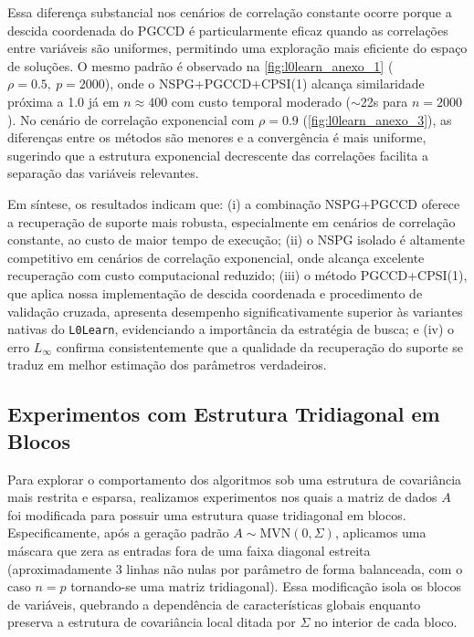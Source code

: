 Essa diferença substancial nos cenários de correlação constante ocorre porque a descida coordenada do PGCCD é particularmente eficaz quando as correlações entre variáveis são uniformes, permitindo uma exploração mais eficiente do espaço de soluções. O mesmo padrão é observado na \autoref{fig:l0learn_anexo_1} ($\rho=0.5,\ p=2000$), onde o NSPG+PGCCD+CPSI(1) alcança similaridade próxima a 1.0 já em $n \approx 400$ com custo temporal moderado ($\sim$22s para $n=2000$). No cenário de correlação exponencial com $\rho=0.9$ (\autoref{fig:l0learn_anexo_3}), as diferenças entre os métodos são menores e a convergência é mais uniforme, sugerindo que a estrutura exponencial decrescente das correlações facilita a separação das variáveis relevantes.

Em síntese, os resultados indicam que: (i) a combinação NSPG+PGCCD oferece a recuperação de suporte mais robusta, especialmente em cenários de correlação constante, ao custo de maior tempo de execução; (ii) o NSPG isolado é altamente competitivo em cenários de correlação exponencial, onde alcança excelente recuperação com custo computacional reduzido; (iii) o método PGCCD+CPSI(1), que aplica nossa implementação de descida coordenada e procedimento de validação cruzada, apresenta desempenho significativamente superior às variantes nativas do \texttt{L0Learn}, evidenciando a importância da estratégia de busca; e (iv) o erro $L_\infty$ confirma consistentemente que a qualidade da recuperação do suporte se traduz em melhor estimação dos parâmetros verdadeiros.

\subsection{Experimentos com Estrutura Tridiagonal em Blocos}

Para explorar o comportamento dos algoritmos sob uma estrutura de covariância mais restrita e esparsa, realizamos experimentos nos quais a matriz de dados $A$ foi modificada para possuir uma estrutura quase tridiagonal em blocos. Especificamente, após a geração padrão $A \sim \text{MVN}(0, \Sigma)$, aplicamos uma máscara que zera as entradas fora de uma faixa diagonal estreita (aproximadamente 3 linhas não nulas por parâmetro de forma balanceada, com o caso $n=p$ tornando-se uma matriz tridiagonal). Essa modificação isola os blocos de variáveis, quebrando a dependência de características globais enquanto preserva a estrutura de covariância local ditada por $\Sigma$ no interior de cada bloco.

